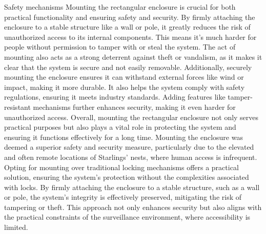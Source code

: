 Safety mechanisms
Mounting the rectangular enclosure is crucial for both practical functionality and ensuring safety and security. By firmly attaching the enclosure to a stable structure like a wall or pole, it greatly reduces the risk of unauthorized access to its internal components. This means it's much harder for people without permission to tamper with or steal the system. The act of mounting also acts as a strong deterrent against theft or vandalism, as it makes it clear that the system is secure and not easily removable. Additionally, securely mounting the enclosure ensures it can withstand external forces like wind or impact, making it more durable. It also helps the system comply with safety regulations, ensuring it meets industry standards. Adding features like tamper-resistant mechanisms further enhances security, making it even harder for unauthorized access. Overall, mounting the rectangular enclosure not only serves practical purposes but also plays a vital role in protecting the system and ensuring it functions effectively for a long time.
Mounting the enclosure was deemed a superior safety and security measure, particularly due to the elevated and often remote locations of Starlings' nests, where human access is infrequent. Opting for mounting over traditional locking mechanisms offers a practical solution, ensuring the system's protection without the complexities associated with locks. By firmly attaching the enclosure to a stable structure, such as a wall or pole, the system's integrity is effectively preserved, mitigating the risk of tampering or theft. This approach not only enhances security but also aligns with the practical constraints of the surveillance environment, where accessibility is limited.


